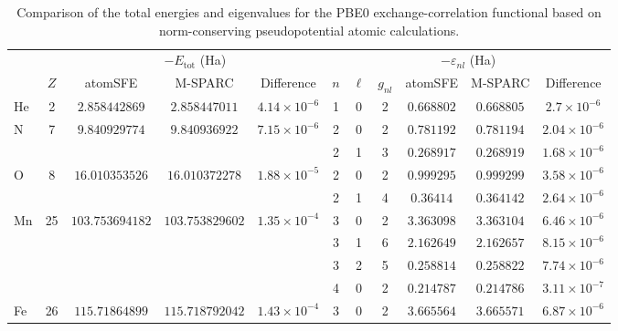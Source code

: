 \begin{table}[!htbp]
    \centering
    \footnotesize
    \setlength{\tabcolsep}{3pt}
    \renewcommand{\arraystretch}{0.9}
    \caption{Comparison of the total energies and eigenvalues for the PBE0 exchange-correlation functional based on norm-conserving pseudopotential atomic calculations.}
    \label{tab:pseudo-pbe0-eigs}
    \begin{tabular}{@{}l c ccc ccc ccc@{}}
        \toprule
        & & \multicolumn{3}{c}{$-E_{\mathrm{tot}}$ (Ha)} & \multicolumn{6}{c}{$-\varepsilon_{nl}$ (Ha)} \\
        \cmidrule(lr){3-5} \cmidrule(lr){6-11}
         & $Z$ & atomSFE & M-SPARC & Difference & $n$ & $\ell$ & $g_{nl}$ & atomSFE & M-SPARC & Difference \\
        \midrule
        \multirow[t]{1}{*}{He} & \multirow[t]{1}{*}{2} & \multirow[t]{1}{*}{$2.858442869$} & \multirow[t]{1}{*}{$2.858447011$} & \multirow[t]{1}{*}{$4.14 \times 10^{-6}$} & 1 & 0 & 2 & $0.668802$ & $0.668805$ & $2.7 \times 10^{-6}$ \\
        \multirow[t]{2}{*}{N} & \multirow[t]{2}{*}{7} & \multirow[t]{2}{*}{$9.840929774$} & \multirow[t]{2}{*}{$9.840936922$} & \multirow[t]{2}{*}{$7.15 \times 10^{-6}$} & 2 & 0 & 2 & $0.781192$ & $0.781194$ & $2.04 \times 10^{-6}$ \\
         &  &  &  &  & 2 & 1 & 3 & $0.268917$ & $0.268919$ & $1.68 \times 10^{-6}$ \\
        \multirow[t]{2}{*}{O} & \multirow[t]{2}{*}{8} & \multirow[t]{2}{*}{$16.010353526$} & \multirow[t]{2}{*}{$16.010372278$} & \multirow[t]{2}{*}{$1.88 \times 10^{-5}$} & 2 & 0 & 2 & $0.999295$ & $0.999299$ & $3.58 \times 10^{-6}$ \\
         &  &  &  &  & 2 & 1 & 4 & $0.36414$ & $0.364142$ & $2.64 \times 10^{-6}$ \\
        \multirow[t]{4}{*}{Mn} & \multirow[t]{4}{*}{25} & \multirow[t]{4}{*}{$103.753694182$} & \multirow[t]{4}{*}{$103.753829602$} & \multirow[t]{4}{*}{$1.35 \times 10^{-4}$} & 3 & 0 & 2 & $3.363098$ & $3.363104$ & $6.46 \times 10^{-6}$ \\
         &  &  &  &  & 3 & 1 & 6 & $2.162649$ & $2.162657$ & $8.15 \times 10^{-6}$ \\
         &  &  &  &  & 3 & 2 & 5 & $0.258814$ & $0.258822$ & $7.74 \times 10^{-6}$ \\
         &  &  &  &  & 4 & 0 & 2 & $0.214787$ & $0.214786$ & $3.11 \times 10^{-7}$ \\
        \multirow[t]{4}{*}{Fe} & \multirow[t]{4}{*}{26} & \multirow[t]{4}{*}{$115.71864899$} & \multirow[t]{4}{*}{$115.718792042$} & \multirow[t]{4}{*}{$1.43 \times 10^{-4}$} & 3 & 0 & 2 & $3.665564$ & $3.665571$ & $6.87 \times 10^{-6}$ \\

\end{tabular}
\end{table}
